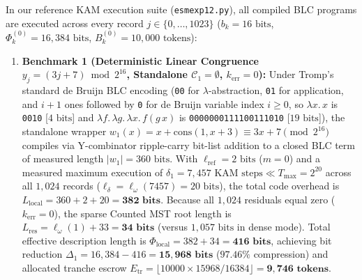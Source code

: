 \documentclass[runningheads,a4paper]{llncs}
\renewcommand{\_}{\textunderscore\allowbreak}
\begin{document}
In our reference KAM execution suite (\texttt{esm\_exp1\_2.py}), all compiled BLC programs are executed across every record $j \in \{0,\allowbreak \dots,\allowbreak 1023\}$ ($b_k = 16\text{ bits}$, $\Phi_k^{(0)} = 16,384\text{ bits}$, $B_k^{(0)} = 10,000\text{ tokens}$):
\begin{enumerate}
  \item \textbf{Benchmark 1 (Deterministic Linear Congruence $y_j = (3j + 7) \bmod 2^{16}$, Standalone $\mathcal{C}_1 = \emptyset$, $k_{\text{err}} = 0$):} Under Tromp's standard de Bruijn BLC encoding \cite{tromp2007} (\texttt{00} for $\lambda$-abstraction, \texttt{01} for application, and $i+1$ ones followed by \texttt{0} for de Bruijn variable index $i \ge 0$, so $\lambda x.\,\allowbreak x$ is \texttt{0010} [$4\text{ bits}$] and $\lambda f.\,\lambda g.\,\lambda x.\,\allowbreak f(g\,x)$ is \texttt{0000000111100111010} [$19\text{ bits}$]), the standalone wrapper $w_1(x) = x + \text{cons}(1,\allowbreak x + 3) \equiv 3x + 7 \pmod{2^{16}}$ compiles via Y-combinator ripple-carry bit-list addition to a closed BLC term of measured length $|w_1| = 360\text{ bits}$. With $\ell_{\text{ref}} = 2\text{ bits}$ ($m = 0$) and a measured maximum execution of $\delta_1 = 7,457\text{ KAM steps} \ll T_{\max} = 2^{20}$ across all $1,024$ records ($\ell_\delta = \ell_\omega(7457) = 20\text{ bits}$), the total code overhead is $L_{\text{local}} = 360 + 2 + 20 = \mathbf{382\text{ bits}}$. Because all $1,024$ residuals equal zero ($k_{\text{err}} = 0$), the sparse Counted MST root length is $L_{\text{res}} = \ell_\omega(1) + 33 = \mathbf{34\text{ bits}}$ (versus $1,057\text{ bits}$ in dense mode). Total effective description length is $\Phi_{\text{local}} = 382 + 34 = \mathbf{416\text{ bits}}$, achieving bit reduction $\Delta_1 = 16,384 - 416 = \mathbf{15,968\text{ bits}}$ ($\mathbf{97.46\%}$ compression) and allocated tranche escrow $E_{\text{tr}} = \lfloor 10000 \times 15968 / 16384 \rfloor = \mathbf{9,746\text{ tokens}}$.

\end{enumerate}
\end{document}
